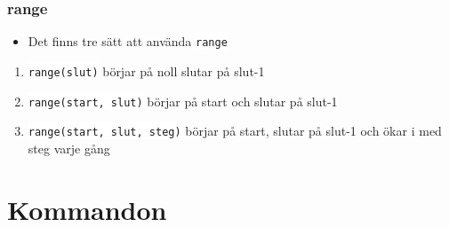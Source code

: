 \documentclass[aspectratio=169]{beamer}
\newcommand{\code}[1]{\colorbox{white}{\lstinline{#1}}}
\begin{document}
\begin{frame}[fragile]
	\frametitle{range}
	
	\begin{itemize}
		\item Det finns tre sätt att använda \code{range}
	\end{itemize}
	
	\begin{enumerate}
		\item \code{range(slut)} börjar på noll slutar på slut-1
		\item \code{range(start, slut)} börjar på start och slutar på slut-1
		\item \code{range(start, slut, steg)} börjar på start, slutar på slut-1 och ökar i med steg varje gång
	\end{enumerate}
	
\end{frame}

\section{Kommandon}

\begin{frame}
	\frametitle{}
\end{frame}
\end{document}
